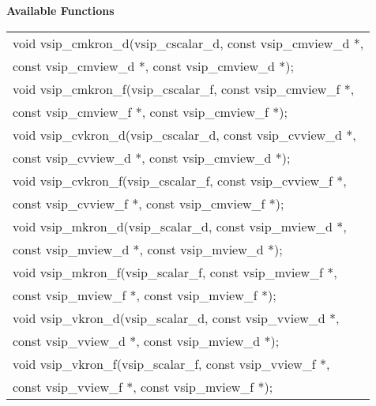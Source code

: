 \\\cvsiplh
\\ \hspace*{.8cm} \vspace*{.1cm} \textbf{Available Functions }
\\ \hspace*{1.1cm} {
\ttfamily
\begin{tabular}[H]{l}
void vsip\_cmkron\_d(vsip\_cscalar\_d, const vsip\_cmview\_d *,\\*\hspace{.6cm}const vsip\_cmview\_d *, const vsip\_cmview\_d *);\\
void vsip\_cmkron\_f(vsip\_cscalar\_f, const vsip\_cmview\_f *,\\*\hspace{.6cm}const vsip\_cmview\_f *, const vsip\_cmview\_f *);\\
void vsip\_cvkron\_d(vsip\_cscalar\_d, const vsip\_cvview\_d *,\\*\hspace{.6cm}const vsip\_cvview\_d *, const vsip\_cmview\_d *);\\
void vsip\_cvkron\_f(vsip\_cscalar\_f, const vsip\_cvview\_f *,\\*\hspace{.6cm}const vsip\_cvview\_f *, const vsip\_cmview\_f *);\\
void vsip\_mkron\_d(vsip\_scalar\_d, const vsip\_mview\_d *,\\*\hspace{.6cm}const vsip\_mview\_d *, const vsip\_mview\_d *);\\
void vsip\_mkron\_f(vsip\_scalar\_f, const vsip\_mview\_f *,\\*\hspace{.6cm}const vsip\_mview\_f *, const vsip\_mview\_f *);\\
void vsip\_vkron\_d(vsip\_scalar\_d, const vsip\_vview\_d *,\\*\hspace{.6cm}const vsip\_vview\_d *, const vsip\_mview\_d *);\\
void vsip\_vkron\_f(vsip\_scalar\_f, const vsip\_vview\_f *,\\*\hspace{.6cm}const vsip\_vview\_f *, const vsip\_mview\_f *);\\
\end{tabular}
}
\\\pyjvsiph
{}

